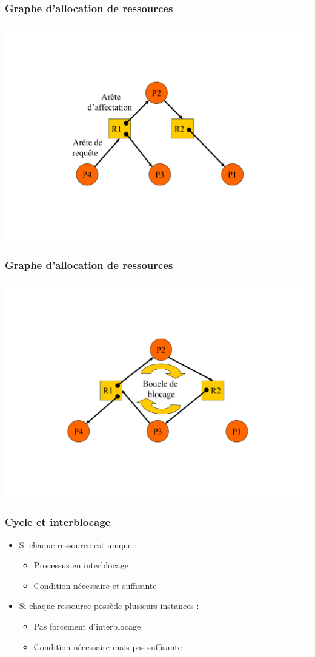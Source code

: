 \begin{frame}
\frametitle{Graphe d’allocation de ressources}
\includegraphics[width=.8\textwidth]{../illustration/graphe_alloc_ressource.pdf}
\end{frame}

\begin{frame}
\frametitle{Graphe d’allocation de ressources}
\includegraphics[width=.8\textwidth]{../illustration/graphe_alloc_ressource_ib.pdf}
\end{frame}

\begin{frame}
\frametitle{Cycle et interblocage}
\begin{itemize}
\item Si chaque ressource est unique :
\begin{itemize}
\item Processus en interblocage
\item Condition nécessaire et suffisante
\end{itemize}
\item Si chaque ressource possède plusieurs instances :
\begin{itemize}
\item Pas forcement d’interblocage
\item Condition nécessaire mais pas suffisante
\end{itemize}
\end{itemize}
\end{frame}

